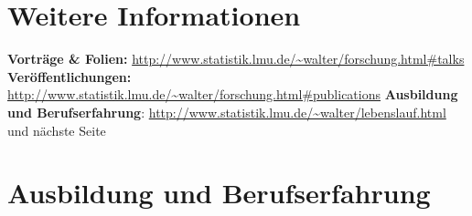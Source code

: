 \documentclass[a4paper]{simplecv}
\begin{document}
\section{Weitere Informationen}
\textbf{\sf Vorträge \& Folien:} \url{http://www.statistik.lmu.de/~walter/forschung.html#talks}\\
\textbf{\sf Veröffentlichungen:} \url{http://www.statistik.lmu.de/~walter/forschung.html#publications}
\textbf{\sf Ausbildung und Berufserfahrung}: \url{http://www.statistik.lmu.de/~walter/lebenslauf.html}\\
\phantom{a} \hfill {\sf und nächste Seite}\\

\newpage
\section{Ausbildung und Berufserfahrung}
\label{education}
\end{document}
